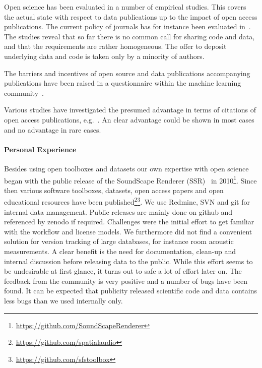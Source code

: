 \documentclass[a4paper, 10pt, twocolumn]{article}
\begin{document}
Open science has been evaluated in a number of empirical studies. This covers the
actual state with respect to data publications up to the impact of open access 
publications. The current policy of journals has for instance been evaluated in~\cite{Stodden2013:PLOS1,Alsheikh11:PLOS}. The studies reveal that so far there is 
no common call for sharing code and data, and that the requirements are rather 
homogeneous. The offer to deposit underlying data and code is taken only by a minority
of authors.

The barriers and incentives of open source and data publications accompanying 
publications have been raised in a questionnaire within the machine learning 
community~\cite{}.

Various studies have investigated the presumed advantage in terms of citations of
open access publications, e.g.~\cite{Swan10:study,McCabe14:EI}. An clear advantage 
could be shown in most cases and no advantage in rare cases.

\paragraph*{Personal Experience}

Besides using open toolboxes and datasets our own expertise with open science began 
with the public release of the SoundScape Renderer (SSR)~\cite{Geier07:DEGA} in 
2010\footnote{\url{https://github.com/SoundScapeRenderer}}. Since then various software toolboxes, 
datasets, open access papers and open educational resources have been 
published\footnote{\url{https://github.com/spatialaudio}}\footnote{\url{https://github.com/sfstoolbox}}. 
We use Redmine, SVN and git for internal data management. Public releases are mainly
done on github and referenced by zenodo if required. Challenges were the initial
effort to get familiar with the workflow and license models. We furthermore did not find
a convenient solution for version tracking of large databases, for instance room 
acoustic measurements. A clear benefit is the need for documentation, clean-up and internal
discussion before releasing data to the public. While this effort seems to be undesirable at
first glance, it turns out to safe a lot of effort later on. The feedback from the community
is very positive and a number of bugs have been found. It can be expected that publicity 
released scientific code and data contains less bugs than we used internally only. 
\end{document}
